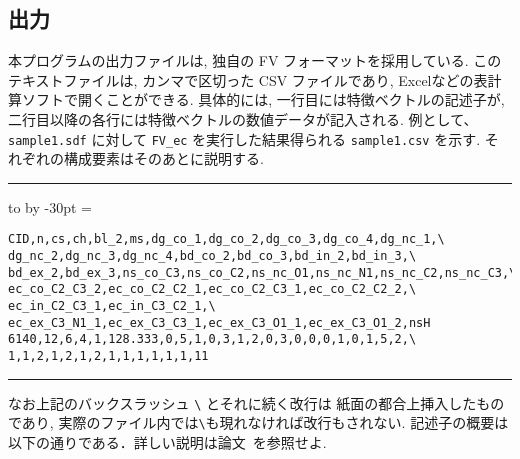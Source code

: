 \documentclass[11pt, titlepage, dvipdfmx, twoside]{jarticle}
\newenvironment{myframe}{\begin{trivlist}\item[]
    \hrule
    \hbox to \linewidth\bgroup
    \advance\linewidth by -30pt
    \hsize=\linewidth
    \vrule\hfill
    \vbox\bgroup
    \vskip15pt
    \def\thempfootnote{\arabic{mpfootnote}}
    \begin{minipage}{\linewidth}}{%
    \end{minipage}\vskip15pt
    \egroup\hfill\vrule
    \egroup\hrule
\end{trivlist}}
\begin{document}
\subsection{出力}
本プログラムの出力ファイルは,
独自の FV フォーマットを採用している.
このテキストファイルは, カンマで区切った CSV ファイルであり,
Excelなどの表計算ソフトで開くことができる.
具体的には, 一行目には特徴ベクトルの記述子が,
二行目以降の各行には特徴ベクトルの数値データが記入される. 
例として、{\tt sample1.sdf} に対して {\tt FV\_ec} を実行した結果得られる
{\tt sample1.csv} を示す.
それぞれの構成要素はそのあとに説明する. 

\begin{myframe}
\begin{verbatim}
CID,n,cs,ch,bl_2,ms,dg_co_1,dg_co_2,dg_co_3,dg_co_4,dg_nc_1,\
dg_nc_2,dg_nc_3,dg_nc_4,bd_co_2,bd_co_3,bd_in_2,bd_in_3,\
bd_ex_2,bd_ex_3,ns_co_C3,ns_co_C2,ns_nc_O1,ns_nc_N1,ns_nc_C2,ns_nc_C3,\
ec_co_C2_C3_2,ec_co_C2_C2_1,ec_co_C2_C3_1,ec_co_C2_C2_2,\
ec_in_C2_C3_1,ec_in_C3_C2_1,\
ec_ex_C3_N1_1,ec_ex_C3_C3_1,ec_ex_C3_O1_1,ec_ex_C3_O1_2,nsH
6140,12,6,4,1,128.333,0,5,1,0,3,1,2,0,3,0,0,0,1,0,1,5,2,\
1,1,2,1,2,1,2,1,1,1,1,1,1,11
\end{verbatim}
\end{myframe}

なお上記のバックスラッシュ \verb|\| とそれに続く改行は
紙面の都合上挿入したものであり, 実際のファイル内では\verb|\|も現れなければ改行もされない. 
記述子の概要は以下の通りである．詳しい説明は論文~\cite{BH_cyclic_arxiv}を参照せよ.
\end{document}
